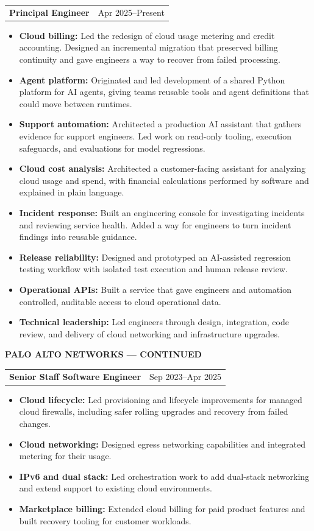 \documentclass[11pt,letterpaper]{article}
\makeatletter
\newcommand{\role}[2]{\needspace{4\baselineskip}\vspace{3pt}\begin{tabularx}{\linewidth}{@{}Xr@{}}{\color{accent}\bfseries #1}&\textcolor{muted}{#2}\end{tabularx}\vspace{-3pt}}
\makeatother
\begin{document}
\role{Principal Engineer}{Apr 2025--Present}
\begin{itemize}
\item \textbf{Cloud billing:} Led the redesign of cloud usage metering and credit accounting. Designed an incremental migration that preserved billing continuity and gave engineers a way to recover from failed processing.
\item \textbf{Agent platform:} Originated and led development of a shared Python platform for AI agents, giving teams reusable tools and agent definitions that could move between runtimes.
\item \textbf{Support automation:} Architected a production AI assistant that gathers evidence for support engineers. Led work on read-only tooling, execution safeguards, and evaluations for model regressions.
\item \textbf{Cloud cost analysis:} Architected a customer-facing assistant for analyzing cloud usage and spend, with financial calculations performed by software and explained in plain language.
\item \textbf{Incident response:} Built an engineering console for investigating incidents and reviewing service health. Added a way for engineers to turn incident findings into reusable guidance.
\item \textbf{Release reliability:} Designed and prototyped an AI-assisted regression testing workflow with isolated test execution and human release review.
\item \textbf{Operational APIs:} Built a service that gave engineers and automation controlled, auditable access to cloud operational data.
\item \textbf{Technical leadership:} Led engineers through design, integration, code review, and delivery of cloud networking and infrastructure upgrades.
\end{itemize}

\clearpage
{\small\color{muted}\bfseries PALO ALTO NETWORKS --- CONTINUED}\par\vspace{5pt}
\role{Senior Staff Software Engineer}{Sep 2023--Apr 2025}
\begin{itemize}
\item \textbf{Cloud lifecycle:} Led provisioning and lifecycle improvements for managed cloud firewalls, including safer rolling upgrades and recovery from failed changes.
\item \textbf{Cloud networking:} Designed egress networking capabilities and integrated metering for their usage.
\item \textbf{IPv6 and dual stack:} Led orchestration work to add dual-stack networking and extend support to existing cloud environments.
\item \textbf{Marketplace billing:} Extended cloud billing for paid product features and built recovery tooling for customer workloads.
\end{itemize}
\end{document}
